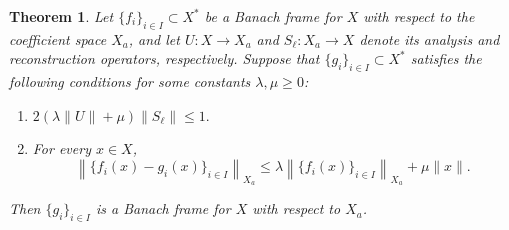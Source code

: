 \documentclass[12pt]{article}
\newtheorem{theorem}{Theorem}[section]
\theoremstyle{definition}
\theoremstyle{remark}
\begin{document}
\begin{theorem}
	Let \(\{f_i\}_{i\in I}\subset X^*\) be a Banach frame for \(X\) with
	respect to the coefficient space \(X_a\), and let \(U:X\to X_a\) and
	\(S_\ell:X_a\to X\) denote its analysis and reconstruction operators,
	respectively. Suppose that \(\{g_i\}_{i\in I}\subset X^*\) satisfies
	the following conditions for some constants \(\lambda,\mu\geq 0\):
	
	\begin{enumerate}
		\item
		\(    2(\lambda\|U\|+\mu)\|S_\ell\|\leq 1.
		\)
	
		\item For every \(x\in X\),
		\[
		\left\|
		\{f_i(x)-g_i(x)\}_{i\in I}
		\right\|_{X_a}
		\leq
		\lambda
		\left\|
		\{f_i(x)\}_{i\in I}
		\right\|_{X_a}
		+\mu\|x\|.
		\]
	
		
	\end{enumerate}
	
	Then \(\{g_i\}_{i\in I}\) is a Banach frame for \(X\) with respect to
	\(X_a\).
\end{theorem}
\end{document}
